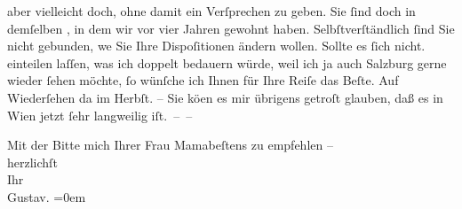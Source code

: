                aber vielleicht doch, ohne damit ein Verſprechen zu geben. Sie{ }ſind doch in demſelben
                  \textsc{\label{K_L04290-1v}\label{K_L04290-1}}, in dem wir vor vier Jahren gewohnt haben. Selbſtverſtändlich{ }ſind Sie nicht
               gebunden, we{\geminationn} Sie Ihre Dispoſitionen ändern wollen.
               Sollte es{ }ſich nicht. einteilen laſſen, was ich doppelt bedauern würde, weil ich ja
               auch Salzburg gerne wieder{ }ſehen möchte,{ }ſo
               wünſche ich Ihnen für Ihre Reiſe das Beſte. Auf Wiederſehen da{\geminationn} im Herbſt. – Sie kö{\geminationn}en es
               mir übrigens getroſt glauben, daß es in Wien jetzt{ }ſehr langweilig iſt. – –\pend
           
\pstart
           Mit der Bitte mich Ihrer Frau Mamabeſtens zu empfehlen –{\\[\baselineskip]}herzlichſt{\\[\baselineskip]}Ihr{\\[\baselineskip]}\spacefill\mbox{Gustav.}\pend
           \leftskip=0em{}\endnumbering{}
\begin{anhang}
\end{anhang}\newcommand{\dateiname}{L04290}\newcommand{\titel}{Gustav Schwarzkopf an Arthur Schnitzler, 18. 7. 1898}\newcommand{\editorInnen}{Herausgegeben von Jahnke, SelmaMüller, Martin Anton}
